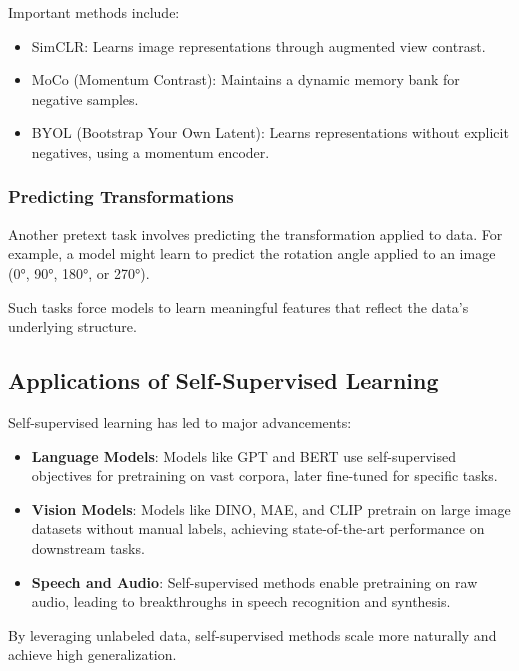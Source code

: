 \documentclass[openany]{book}
\begin{document}
Important methods include:
\begin{itemize}
    \item SimCLR: Learns image representations through augmented view contrast.
    \item MoCo (Momentum Contrast): Maintains a dynamic memory bank for negative 
    samples.
    \item BYOL (Bootstrap Your Own Latent): Learns representations without 
    explicit negatives, using a momentum encoder.
\end{itemize}

\subsubsection{Predicting Transformations}
Another pretext task involves predicting the transformation applied to data. For 
example, a model might learn to predict the rotation angle applied to an image 
(0°, 90°, 180°, or 270°).

Such tasks force models to learn meaningful features that reflect the data's 
underlying structure.

\subsection{Applications of Self-Supervised Learning}
Self-supervised learning has led to major advancements:
\begin{itemize}
    \item \textbf{Language Models}: Models like GPT and BERT use self-supervised 
    objectives for pretraining on vast corpora, later fine-tuned for specific 
    tasks.
    \item \textbf{Vision Models}: Models like DINO, MAE, and CLIP pretrain on 
    large image datasets without manual labels, achieving state-of-the-art 
    performance on downstream tasks.
    \item \textbf{Speech and Audio}: Self-supervised methods enable pretraining
     on raw audio, leading to breakthroughs in speech recognition and synthesis.
\end{itemize}

By leveraging unlabeled data, self-supervised methods scale more naturally and 
achieve high generalization.
\end{document}
